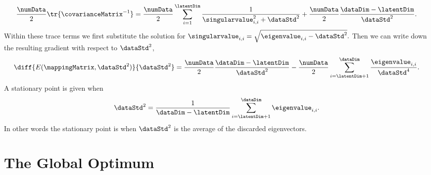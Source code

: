 \[
\frac{\numData}{2}\tr{\covarianceMatrix^{-1}} =
\frac{\numData}{2}\sum_{i=1}^\latentDim
\frac{1}{\singularvalue_{i,i}^2 +\dataStd^2} +
\frac{\numData}{2}\frac{\dataDim - \latentDim}{\dataStd^2}.
\]
Within these trace terms we first substitute the solution for
$\singularvalue_{i, i} = \sqrt{\eigenvalue_{i, i} -\dataStd^2}. $ Then
we can write down the resulting gradient with respect to $\dataStd^2$,
\[
\diff{E(\mappingMatrix, \dataStd^2)}{\dataStd^2} = \frac{\numData}{2}\frac{\dataDim - \latentDim}{\dataStd^2}-\frac{\numData}{2}\sum_{i=\latentDim+1}^\dataDim \frac{\eigenvalue_{i, i}}{\dataStd^4}. 
\]
A stationary point is given when 
\[
\dataStd^2 =\frac{1}{\dataDim - \latentDim} \sum_{i=\latentDim+1}^\dataDim \eigenvalue_{i, i}.
\]
In other words the stationary point is when $\dataStd^2$ is the
average of the discarded eigenvectors.

\section{The Global Optimum}

